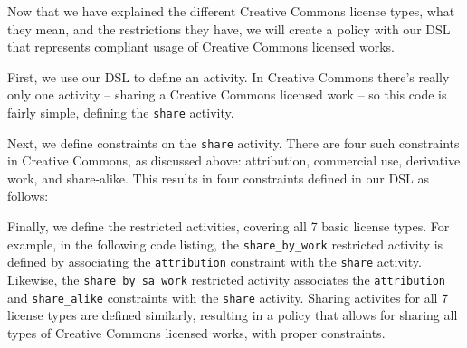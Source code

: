 Now that we have explained the different Creative Commons license types, what
they mean, and the restrictions they have, we will create a policy with our DSL
that represents compliant usage of Creative Commons licensed works.

First, we use our DSL to define an activity.  In Creative Commons there's
really only one activity --  sharing a Creative Commons licensed work -- so
this code is fairly simple, defining the \texttt{share} activity.



Next, we define constraints on the \texttt{share} activity.  There are four
such constraints in Creative Commons, as discussed above: attribution,
commercial use, derivative work, and share-alike.  This results in four
constraints defined in our DSL as follows:



Finally, we define the restricted activities, covering all 7 basic license
types.  For example, in the following code listing, the
\texttt{share\_by\_work} restricted activity is defined by associating the
\texttt{attribution} constraint with the \texttt{share} activity. Likewise, the
\texttt{share\_by\_sa\_work} restricted activity associates the
\texttt{attribution} and \texttt{share\_alike} constraints with the
\texttt{share} activity.  Sharing activites for all 7 license types are defined
similarly, resulting in a policy that allows for sharing all types of Creative
Commons licensed works, with proper constraints.


